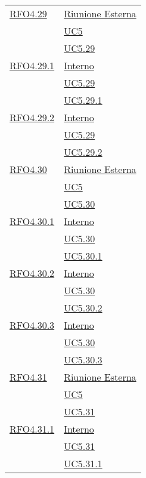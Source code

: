 \begin{longtable}{|>{\centering}m{5cm}|m{5cm}<{\centering}|}
\hyperlink{RFO4.29}{RFO4.29} & \hyperlink{Riunione Esterna}{Riunione Esterna}\\ &\hyperref[UC5]{UC5}\\ &\hyperref[UC5.29]{UC5.29}\\ \hline

\hyperlink{RFO4.29.1}{RFO4.29.1} & \hyperlink{Interno}{Interno}\\ &\hyperref[UC5.29]{UC5.29}\\ &\hyperref[UC5.29.1]{UC5.29.1}\\ \hline

\hyperlink{RFO4.29.2}{RFO4.29.2} &  \hyperlink{Interno}{Interno}\\ &\hyperref[UC5.29]{UC5.29}\\ &\hyperref[UC5.29.2]{UC5.29.2}\\ \hline

\hyperlink{RFO4.30}{RFO4.30} &\hyperlink{Riunione Esterna}{Riunione Esterna}\\ &\hyperref[UC5]{UC5}\\ &\hyperref[UC5.30]{UC5.30}\\ \hline

\hyperlink{RFO4.30.1}{RFO4.30.1} & \hyperlink{Interno}{Interno}\\ &\hyperref[UC5.30]{UC5.30}\\ &\hyperref[UC5.30.1]{UC5.30.1}\\ \hline

\hyperlink{RFO4.30.2}{RFO4.30.2} & \hyperlink{Interno}{Interno}\\ &\hyperref[UC5.30]{UC5.30}\\ &\hyperref[UC5.30.2]{UC5.30.2}\\ \hline

\hyperlink{RFO4.30.3}{RFO4.30.3} & \hyperlink{Interno}{Interno}\\ &\hyperref[UC5.30]{UC5.30}\\ &\hyperref[UC5.30.3]{UC5.30.3}\\ \hline

\hyperlink{RFO4.31}{RFO4.31} & \hyperlink{Riunione Esterna}{Riunione Esterna}\\ &\hyperref[UC5]{UC5}\\ &\hyperref[UC5.31]{UC5.31}\\ \hline

\hyperlink{RFO4.31.1}{RFO4.31.1} &  \hyperlink{Interno}{Interno}\\ &\hyperref[UC5.31]{UC5.31}\\ &\hyperref[UC5.31.1]{UC5.31.1}\\ \hline


\end{longtable}
